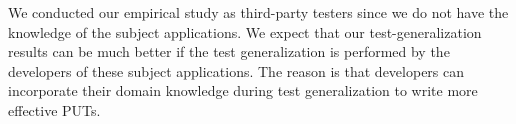 We conducted our empirical study as third-party testers since we do not have the knowledge of the subject applications. We expect that our test-generalization results can be much better if the test generalization is performed by the developers of these subject applications. The reason is that developers can incorporate their domain knowledge during test generalization to write more effective PUTs.



